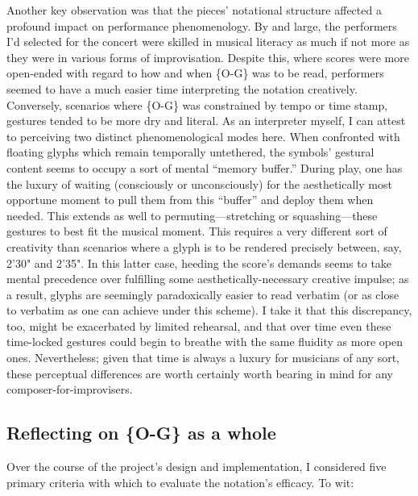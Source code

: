    Another key observation was that the pieces' notational structure affected a profound impact on performance phenomenology. By and large, the performers I'd selected for the concert were skilled in musical literacy as much if not more as they were in various forms of improvisation. Despite this, where scores were more open-ended with regard to how and when \{O-G\} was to be read, performers seemed to have a much easier time interpreting the notation creatively. Conversely, scenarios where \{O-G\} was constrained by tempo or time stamp, gestures tended to be more dry and literal. As an interpreter myself, I can attest to perceiving two distinct phenomenological modes here. When confronted with floating glyphs which remain temporally untethered, the symbols' gestural content seems to occupy a sort of mental ``memory buffer.'' During play, one has the luxury of waiting (consciously or unconsciously) for the aesthetically most opportune moment to pull them from this ``buffer'' and deploy them when needed. This extends as well to permuting---stretching or squashing---these gestures to best fit the musical moment. This requires a very different sort of creativity than scenarios where a glyph is to be rendered precisely between, say, 2'30" and 2'35". In this latter case, heeding the score's demands seems to take mental precedence over fulfilling some aesthetically-necessary creative impulse; as a result, glyphs are seemingly paradoxically easier to read verbatim (or as close to verbatim as one can achieve under this scheme). I take it that this discrepancy, too, might be exacerbated by limited rehearsal, and that over time even these time-locked gestures could begin to breathe with the same fluidity as more open ones. Nevertheless; given that time is always a luxury for musicians of any sort, these perceptual differences are worth certainly worth bearing in mind for any composer-for-improvisers. 

    \subsection{Reflecting on \{O-G\} as a whole}

    Over the course of the project's design and implementation, I considered five primary criteria with which to evaluate the notation's efficacy. To wit:

